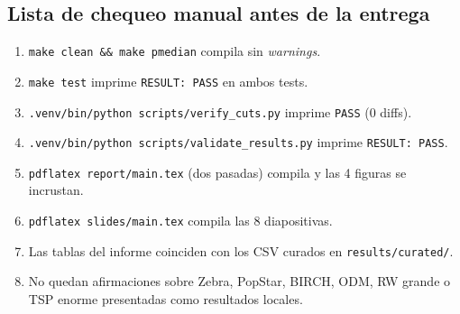 \subsection*{Lista de chequeo manual antes de la entrega}
\begin{enumerate}[noitemsep]
  \item \texttt{make clean \&\& make pmedian} compila sin \emph{warnings}.
  \item \texttt{make test} imprime \texttt{RESULT: PASS} en ambos tests.
  \item \texttt{.venv/bin/python scripts/verify\_cuts.py} imprime \texttt{PASS} (0 diffs).
  \item \texttt{.venv/bin/python scripts/validate\_results.py} imprime \texttt{RESULT: PASS}.
  \item \texttt{pdflatex report/main.tex} (dos pasadas) compila y las 4 figuras se incrustan.
  \item \texttt{pdflatex slides/main.tex} compila las 8 diapositivas.
  \item Las tablas del informe coinciden con los CSV curados en \texttt{results/curated/}.
  \item No quedan afirmaciones sobre Zebra, PopStar, BIRCH, ODM, RW grande o TSP enorme presentadas
        como resultados locales.
\end{enumerate}
